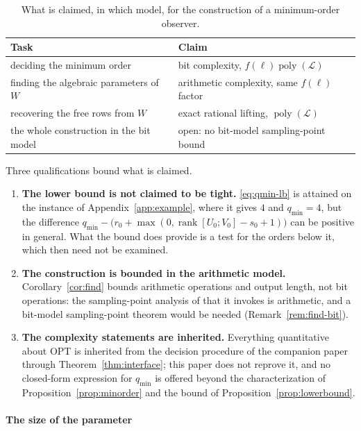 ﻿\documentclass[journal]{IEEEtran}
\theoremstyle{plainn}
\theoremstyle{remark}
\begin{document}
\begin{table}[!t]
\centering
\caption{What is claimed, in which model, for the construction of a minimum-order observer.}
\label{tab:models}
\footnotesize
\begin{tabular}{@{}p{}p{}@{}}
\toprule
Task & Claim \\
\midrule
deciding the minimum order & bit complexity, $f(\ell)\operatorname{poly}(\mathcal L)$ \\
finding the algebraic parameters of $W$ & arithmetic complexity, same $f(\ell)$ factor \\
recovering the free rows from $W$ & exact rational lifting, $\operatorname{poly}(\mathcal L)$ \\
the whole construction in the bit model & open: no bit-model sampling-point bound \\
\bottomrule
\end{tabular}
\end{table}

Three qualifications bound what is claimed.

\begin{enumerate}
\item \textbf{The lower bound is not claimed to be tight.} \eqref{eq:qmin-lb} is attained on the
instance of Appendix~\ref{app:example}, where it gives $4$ and $q_{\min}=4$, but the difference
$q_{\min}-\bigl(r_0+\max(0,\operatorname{rank}[U_0;V_0]-s_0+1)\bigr)$ can be positive in general. What
the bound does provide is a test for the orders below it, which then need not be examined.
\item \textbf{The construction is bounded in the arithmetic model.} Corollary~\ref{cor:find} bounds
arithmetic operations and output length, not bit operations: the sampling-point analysis of
\cite{bpr06} that it invokes is arithmetic, and a bit-model sampling-point theorem would be needed
(Remark~\ref{rem:find-bit}).
\item \textbf{The complexity statements are inherited.} Everything quantitative about
$\mathrm{OPT}$ is inherited from the decision procedure of the companion paper through
Theorem~\ref{thm:interface}; this paper does not reprove it, and no closed-form expression for
$q_{\min}$ is offered beyond the characterization of Proposition~\ref{prop:minorder} and the bound of
Proposition~\ref{prop:lowerbound}.
\end{enumerate}

\paragraph*{The size of the parameter}\label{sec:paramsize}
\end{document}
